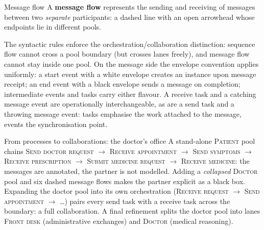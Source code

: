 \begin{definitionbox}{Message flow}
A \textbf{message flow} represents the sending and receiving of messages between two \emph{separate} participants: a dashed line with an open arrowhead whose endpoints lie in different pools.
\end{definitionbox}

The syntactic rules enforce the orchestration/collaboration distinction: sequence flow cannot cross a pool boundary (but crosses lanes freely), and message flow cannot stay inside one pool. On the message side the envelope convention applies uniformly: a start event with a white envelope creates an instance upon message receipt; an end event with a black envelope sends a message on completion; intermediate events and tasks carry either flavour. A receive task and a catching message event are operationally interchangeable, as are a send task and a throwing message event: tasks emphasise the work attached to the message, events the synchronisation point.

\begin{examplebox}{From processes to collaborations: the doctor's office}
A stand-alone \textsc{Patient} pool chains \textsc{Send doctor request} $\to$ \textsc{Receive appointment} $\to$ \textsc{Send symptoms} $\to$ \textsc{Receive prescription} $\to$ \textsc{Submit medicine request} $\to$ \textsc{Receive medicine}: the messages are annotated, the partner is not modelled. Adding a \emph{collapsed} \textsc{Doctor} pool and six dashed message flows makes the partner explicit as a black box. Expanding the doctor pool into its own orchestration (\textsc{Receive request} $\to$ \textsc{Send appointment} $\to$ \dots) pairs every send task with a receive task across the boundary: a full collaboration. A final refinement splits the doctor pool into lanes \textsc{Front desk} (administrative exchanges) and \textsc{Doctor} (medical reasoning).
\end{examplebox}

